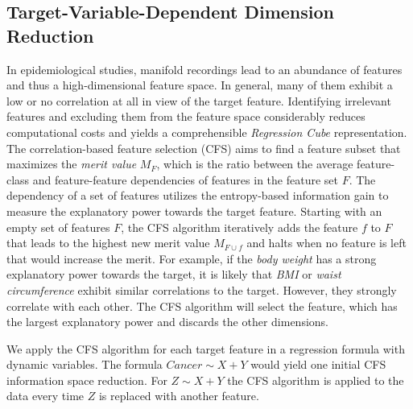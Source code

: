 \documentclass[journal]{style/vgtc} 			          %
\begin{document}
\subsection{Target-Variable-Dependent Dimension Reduction}
In epidemiological studies, manifold recordings lead to an abundance of features and thus a high-dimensional feature space.
In general, many of them exhibit a low or no correlation at all in view of the target feature.
Identifying irrelevant features and excluding them from the feature space considerably reduces computational costs and yields a comprehensible \emph{Regression Cube} representation.
The correlation-based feature selection (CFS) \cite{CFS} aims to find a feature subset that maximizes the \emph{merit value} $M_F$, which is the ratio between the average feature-class and feature-feature dependencies of features in the feature set $F$.
The dependency of a set of features utilizes the entropy-based information gain to measure the explanatory power towards the target feature.
Starting with an empty set of features $F$, the CFS algorithm iteratively adds the feature $f$ to $F$ that leads to the highest new merit value $M_{F\cup f}$ and halts when no feature is left that would increase the merit.
For example, if the \emph{body weight} has a strong explanatory power towards the target, it is likely that \emph{BMI} or \emph{waist circumference} exhibit similar correlations to the target.
However, they strongly correlate with each other.
The CFS algorithm will select the feature, which has the largest explanatory power and discards the other dimensions.

We apply the CFS algorithm for each target feature in a regression formula with dynamic variables.
The formula $Cancer \sim X + Y$ would yield one initial CFS information space reduction.
For $Z \sim X + Y$ the CFS algorithm is applied to the data every time $Z$ is replaced with another feature.
\end{document}
